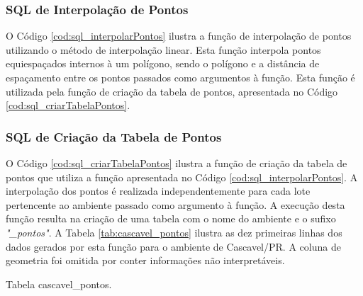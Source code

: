 

\subsubsection{SQL de Interpolação de Pontos}

O Código \ref{cod:sql_interpolarPontos} ilustra a função de interpolação de pontos utilizando o método de interpolação linear. Esta função interpola pontos equiespaçados internos à um polígono, sendo o polígono e a distância de espaçamento entre os pontos passados como argumentos à função. Esta função é utilizada pela função de criação da tabela de pontos, apresentada no Código \ref{cod:sql_criarTabelaPontos}. 



\subsubsection{SQL de Criação da Tabela de Pontos}

O Código \ref{cod:sql_criarTabelaPontos} ilustra a função de criação da tabela de pontos que utiliza a função apresentada no Código \ref{cod:sql_interpolarPontos}. A interpolação dos pontos é realizada independentemente para cada lote pertencente ao ambiente passado como argumento à função. A execução desta função resulta na criação de uma tabela com o nome do ambiente e o sufixo \textit{"\_pontos"}. A Tabela \ref{tab:cascavel_pontos} ilustra as dez primeiras linhas dos dados gerados por esta função para o ambiente de Cascavel/PR. A coluna de geometria foi omitida por conter informações não interpretáveis.



\begin{table}[H]
\centering
{}
\caption{Tabela cascavel\_pontos.}
\label{tab:cascavel_pontos}
\end{table}

